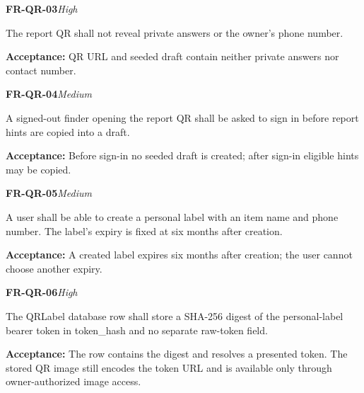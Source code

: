 \documentclass[12pt,a4paper,oneside]{report}
\begin{document}
\noindent\begin{minipage}{\linewidth}\textbf{FR-QR-03}\hfill\textit{High}\par\nopagebreak

The report QR shall not reveal private answers or the owner's phone number.

{\color{muted}\textbf{Acceptance:} QR URL and seeded draft contain neither private answers nor contact number.\par}\end{minipage}\par\vspace{5pt}

\noindent\begin{minipage}{\linewidth}\textbf{FR-QR-04}\hfill\textit{Medium}\par\nopagebreak

A signed-out finder opening the report QR shall be asked to sign in before report hints are copied into a draft.

{\color{muted}\textbf{Acceptance:} Before sign-in no seeded draft is created; after sign-in eligible hints may be copied.\par}\end{minipage}\par\vspace{5pt}

\noindent\begin{minipage}{\linewidth}\textbf{FR-QR-05}\hfill\textit{Medium}\par\nopagebreak

A user shall be able to create a personal label with an item name and phone number. The label's expiry is fixed at six months after creation.

{\color{muted}\textbf{Acceptance:} A created label expires six months after creation; the user cannot choose another expiry.\par}\end{minipage}\par\vspace{5pt}

\noindent\begin{minipage}{\linewidth}\textbf{FR-QR-06}\hfill\textit{High}\par\nopagebreak

The QRLabel database row shall store a SHA-256 digest of the personal-label bearer token in token\_hash and no separate raw-token field.

{\color{muted}\textbf{Acceptance:} The row contains the digest and resolves a presented token. The stored QR image still encodes the token URL and is available only through owner-authorized image access.\par}\end{minipage}\par\vspace{5pt}
\end{document}
